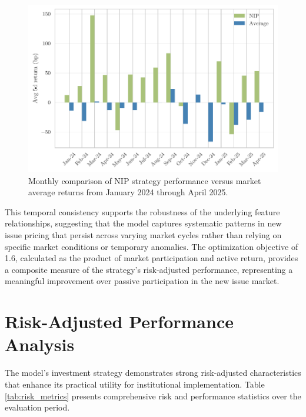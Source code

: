 \begin{figure}[h]
    \begin{center}
        \includegraphics[width=\textwidth]{images/monthly_comparison.pdf}
    \end{center}
    \caption{Monthly comparison of NIP strategy performance versus market average returns from January 2024 through April 2025.}
    \label{fig:monthly_performance}
\end{figure}

This temporal consistency supports the robustness of the underlying feature relationships, suggesting that the model captures systematic patterns in new issue pricing that persist across varying market cycles rather than relying on specific market conditions or temporary anomalies. The optimization objective of 1.6, calculated as the product of market participation and active return, provides a composite measure of the strategy's risk-adjusted performance, representing a meaningful improvement over passive participation in the new issue market.

\section{Risk-Adjusted Performance Analysis}

The model's investment strategy demonstrates strong risk-adjusted characteristics that enhance its practical utility for institutional implementation. Table \ref{tab:risk_metrics} presents comprehensive risk and performance statistics over the evaluation period.

